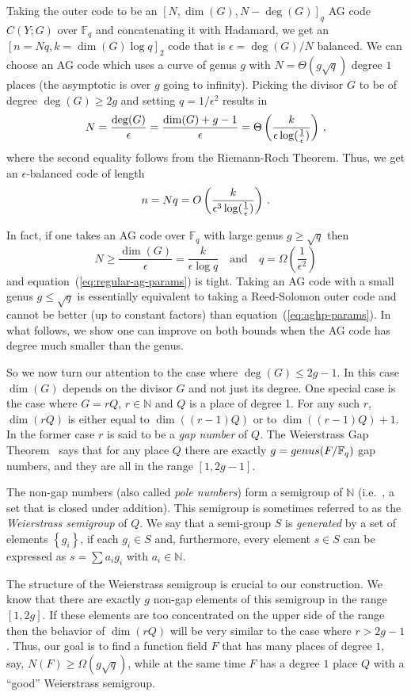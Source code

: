 \documentclass[10pt]{article}
\theoremstyle{definition}
\providecommand{\ie}{i.e.\ }
\numberwithin{equation}{section}
\newcommand{\Fq}{{\mathbb{F}_q}}
\newcommand{\eps}{\epsilon}
\newcommand{\logeps}{\log({1 \over \epsilon})}
\newcommand{\set}[1]{{\left\{#1\right\}}}
\newcommand{\Pl}{{Y}}
\begin{document}
Taking the outer code to be an $[N,\dim(G),N-\deg(G)]_q$ AG code
$C(\Pl;G)$ over $\Fq $ and concatenating it with Hadamard, we get an
$[n=Nq,k=\dim(G) \log q]_2$ code that is $\eps={\deg(G)}/{N}$
balanced. We can choose an AG code which uses a curve of genus $g$
with $N = \Theta(g \sqrt{q})$ degree $1$ places (the asymptotic is
over $g$ going to infinity). Picking the divisor $G$ to be of degree
$\deg(G) \ge 2g$ and setting $q= {1}/{\eps^2}$ results in
%
%
$$ N = \frac{\deg(G)}{\eps} = \frac{\dim(G)+g-1}{\eps}
= \Theta\left( \frac{k}{\eps \logeps}\right)\,,$$ where the second equality
follows from the Riemann-Roch Theorem. Thus, we get an
$\eps$-balanced code of length
\begin{equation}\label{eq:regular-ag-params}
    n = Nq = O\left(\frac{k}{\eps^3 \logeps}\right)\,.
\end{equation}

In fact, if one takes an AG code over $\Fq$ with large genus $g \ge
\sqrt{q}$ then $$N \ge \frac{\dim(G)}{\eps} = \frac{k}{\eps \log
q}\quad\text{and}\quad q=\Omega\left(\frac{1}{\eps^2}\right)$$ and
equation~(\ref{eq:regular-ag-params}) is tight. Taking an AG code
with a small genus $g \le \sqrt{q}$ is essentially equivalent to
taking a Reed-Solomon outer code and cannot be better (up to
constant factors) than equation~(\ref{eq:aghp-params}). In what
follows, we show one can improve on both bounds when the AG code has
degree much smaller than the genus.


So we now turn our attention to the case where $\deg(G) \le 2g-1$.
In this case $\dim(G)$ depends on the divisor $G$ and not just its
degree. One special case is the case where $G = rQ$, $r \in
\mathbb{N}$ and $Q$ is a place of degree 1. For any such $r$,
$\dim(rQ)$ is either equal to $\dim((r-1)Q)$ or to $\dim((r-1)Q)+1$.
In the former case $r$ is said to be a \emph{gap number} of $Q$. The
Weierstrass Gap Theorem~\cite[Thm I.6.7]{S:93} says that for any
place $Q$ there are exactly $g={\rm genus}(F/\Fq )$ gap numbers, and
they are all in the range $[1,2g-1]$.

The non-gap numbers (also called \emph{pole numbers}) form a
semigroup of $\mathbb{N}$ (\ie, a set that is closed under
addition). This semigroup is sometimes referred to as the
\emph{Weierstrass semigroup} of $Q$. We say that a semi-group $S$ is
\emph{generated} by a set of elements $\set{g_i}$, if each $g_i \in S$ and,
furthermore, every element $s \in S$ can be expressed as $s=\sum a_i
g_i$ with $a_i \in \mathbb{N}$.

The structure of the Weierstrass semigroup is crucial to our
construction. We know that there are exactly $g$ non-gap elements of
this semigroup in the range $[1,2g]$. If these elements are too
concentrated on the upper side of the range then the behavior of
$\dim(rQ)$ will be very similar to the case where $r > 2g-1$. Thus,
our goal is to find a function field $F$ that has many places of
degree $1$, say, $N(F) \ge \Omega(g \sqrt{q})$, while at the same
time $F$ has a degree $1$ place $Q$ with a ``good'' Weierstrass
semigroup.
\end{document}
